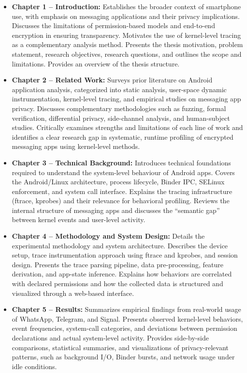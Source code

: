 \documentclass[a4paper,12pt]{report}
\begin{document}
\begin{itemize}
    \item \textbf{Chapter 1 – Introduction:} Establishes the broader context of smartphone use, with emphasis on messaging applications and their privacy implications. Discusses the limitations of permission-based models and end-to-end encryption in ensuring transparency. Motivates the use of kernel-level tracing as a complementary analysis method. Presents the thesis motivation, problem statement, research objectives, research questions, and outlines the scope and limitations. Provides an overview of the thesis structure.

    \item \textbf{Chapter 2 – Related Work:} Surveys prior literature on Android application analysis, categorized into static analysis, user-space dynamic instrumentation, kernel-level tracing, and empirical studies on messaging app privacy. Discusses complementary methodologies such as fuzzing, formal verification, differential privacy, side-channel analysis, and human-subject studies. Critically examines strengths and limitations of each line of work and identifies a clear research gap in systematic, runtime profiling of encrypted messaging apps using kernel-level methods.

    \item \textbf{Chapter 3 – Technical Background:} Introduces technical foundations required to understand the system-level behaviour of Android apps. Covers the Android/Linux architecture, process lifecycle, Binder IPC, SELinux enforcement, and system call interface. Explains the tracing infrastructure (ftrace, kprobes) and their relevance for behavioral profiling. Reviews the internal structure of messaging apps and discusses the “semantic gap” between kernel events and user-level activity.

    \item \textbf{Chapter 4 – Methodology and System Design:} Details the experimental methodology and system architecture. Describes the device setup, trace instrumentation approach using ftrace and kprobes, and session design. Presents the trace parsing pipeline, data pre-processing, feature derivation, and app-state inference. Explains how behaviors are correlated with declared permissions and how the collected data is structured and visualized through a web-based interface.

    \item \textbf{Chapter 5 – Results:} Summarizes empirical findings from real-world usage of WhatsApp, Telegram, and Signal. Presents observed kernel-level behaviors, event frequencies, system-call categories, and deviations between permission declarations and actual system-level activity. Provides side-by-side comparisons, statistical summaries, and visualizations of privacy-relevant patterns, such as background I/O, Binder bursts, and network usage under idle conditions.


\end{itemize}
\end{document}
